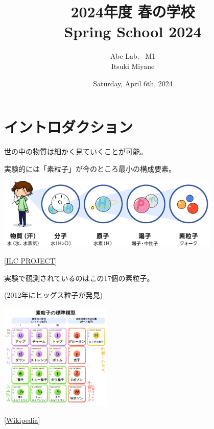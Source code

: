\documentclass[
  unicode,a4paper,11pt,aspectratio=169,
  xcolor = {dvipsnames,svgnames},
  hyperref ={colorlinks=true,citecolor=Navy,linkcolor=NavyBlue,urlcolor=purple},
  ja=standard,lualatex
]{beamer}
\title{
  2024年度 春の学校 \\
  Spring School 2024
}
\author{
  Abe Lab. \ M1
  \texorpdfstring{\\}{}
  \texorpdfstring{\vspace*{3pt}}{}
  Itsuki Miyane
}
\date{Saturday, April 6th, 2024}
\begin{document}
\begin{frame}
  \titlepage
\end{frame}


\section{イントロダクション}

\begin{frame}
  \huge \secname
\end{frame}

\begin{frame}
  世の中の物質は細かく見ていくことが可能。

  実験的には「素粒子」が今のところ最小の構成要素。

  \begin{center}
    \includegraphics[width=0.8\textwidth]{fig/ILCproject.png}       

    \vspace*{-5pt}
    { \small
      \hspace*{6cm}
      [\href{https://aaa-sentan.org/ILC/about_physics/anatomy01.html}{ILC PROJECT}]
    }   
  \end{center}

\end{frame}

\begin{frame}
  
  \begin{center}

    実験で観測されているのはこの17個の素粒子。
  
    (2012年にヒッグス粒子が発見)

    \includegraphics[width=0.4\textwidth]{fig/SM.png}  

    \vspace*{-15pt}
    { \small
      \hspace*{4cm}
      [\href{https://ja.wikipedia.org/wiki/標準模型}{Wikipedia}]
    }
  \end{center}

\end{frame}
\end{document}
